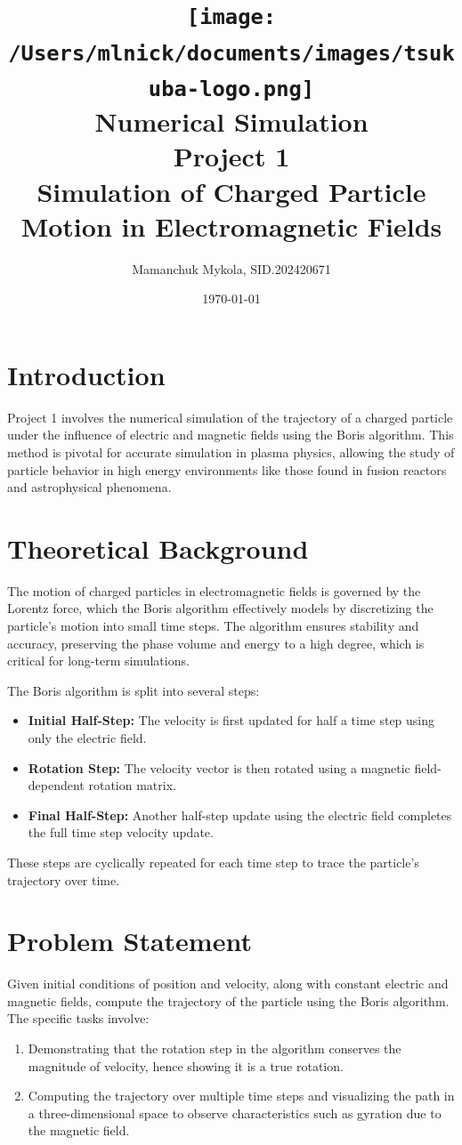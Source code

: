 \documentclass{article}
\title{
    \texttt{[image: /Users/mlnick/documents/images/tsukuba-logo.png]} \\
    \vspace{2mm}
    \textbf{Numerical Simulation} \\
    \vspace{3mm}    
    Project 1 \\
    Simulation of Charged Particle Motion in Electromagnetic Fields
}
\author{Mamanchuk Mykola, SID.202420671}
\date{\today}
\begin{document}
\maketitle

\section{Introduction}
Project 1 involves the numerical simulation of the trajectory of a charged particle under the influence of electric and magnetic fields using the Boris algorithm. This method is pivotal for accurate simulation in plasma physics, allowing the study of particle behavior in high energy environments like those found in fusion reactors and astrophysical phenomena.

\section{Theoretical Background}
The motion of charged particles in electromagnetic fields is governed by the Lorentz force, which the Boris algorithm effectively models by discretizing the particle's motion into small time steps. The algorithm ensures stability and accuracy, preserving the phase volume and energy to a high degree, which is critical for long-term simulations.

The Boris algorithm is split into several steps:
\begin{itemize}
    \item \textbf{Initial Half-Step:} The velocity is first updated for half a time step using only the electric field.
    \item \textbf{Rotation Step:} The velocity vector is then rotated using a magnetic field-dependent rotation matrix.
    \item \textbf{Final Half-Step:} Another half-step update using the electric field completes the full time step velocity update.
\end{itemize}

These steps are cyclically repeated for each time step to trace the particle's trajectory over time.

\section{Problem Statement}
Given initial conditions of position and velocity, along with constant electric and magnetic fields, compute the trajectory of the particle using the Boris algorithm. The specific tasks involve:
\begin{enumerate}
    \item Demonstrating that the rotation step in the algorithm conserves the magnitude of velocity, hence showing it is a true rotation.
    \item Computing the trajectory over multiple time steps and visualizing the path in a three-dimensional space to observe characteristics such as gyration due to the magnetic field.
\end{enumerate}
\end{document}
